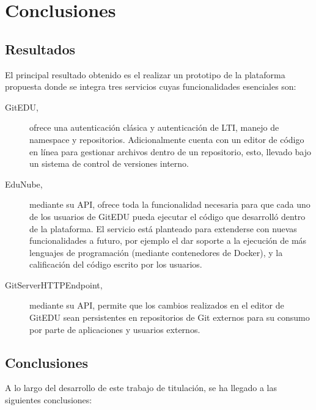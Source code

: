 
\chapter{Conclusiones}
\label{capitulo7}

\section{Resultados}
El principal resultado obtenido es el realizar un prototipo de la plataforma propuesta donde se integra tres servicios cuyas funcionalidades esenciales son:
\begin{description}
	\item[GitEDU,] ofrece una autenticación clásica y autenticación de LTI, manejo de namespace y repositorios. Adicionalmente cuenta con un editor de código en línea para gestionar archivos dentro de un repositorio, esto, llevado bajo un sistema de control de versiones interno.
    \item[EduNube,] mediante su API, ofrece toda la funcionalidad necesaria para que cada uno de los usuarios de GitEDU pueda ejecutar el código que desarrolló dentro de la plataforma. El servicio está planteado para extenderse con nuevas funcionalidades a futuro, por ejemplo el dar soporte a la ejecución de más lenguajes de programación (mediante contenedores de Docker), y la calificación del código escrito por los usuarios.
    \item[GitServerHTTPEndpoint,] mediante su API, permite que los cambios realizados en el editor de GitEDU sean persistentes en repositorios de Git externos para su consumo por parte de aplicaciones y usuarios externos.
\end{description}

\section{Conclusiones}
A lo largo del desarrollo de este trabajo de titulación, se ha llegado a las siguientes conclusiones:

